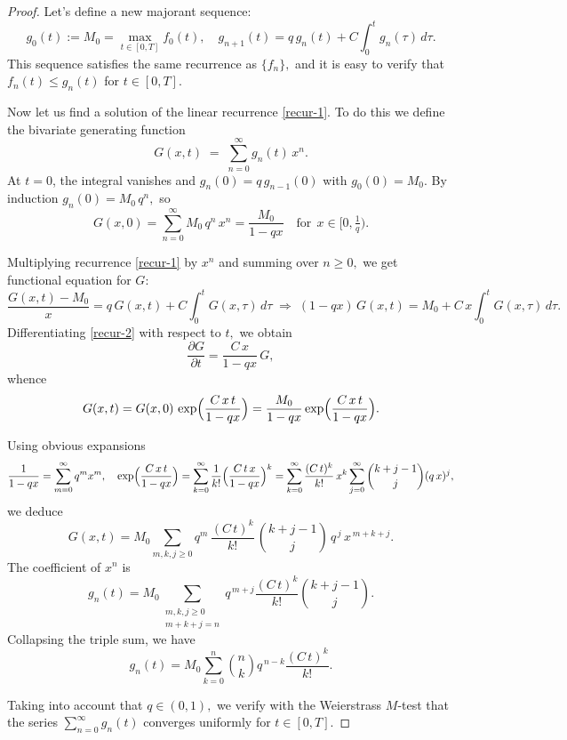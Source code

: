\documentclass[reqno]{amsart}            %
\numberwithin{equation}{section}
\begin{document}
	\begin{proof} 
		Let’s define a new majorant sequence:
		\begin{equation}\label{recur-1}
			g_0(t) := M_0 = \max_{t \in [0,T]} f_0(t), \quad
			g_{n+1}(t) = q\,  g_n(t) + C \int_0^t g_n(\tau)\, d\tau.
		\end{equation}
		This sequence satisfies the same recurrence as $\{f_n\},$ and it is easy to verify that
		$f_n(t) \le g_n(t)$ for $t\in [0,T].$
		
		Now let us find a solution of  the linear recurrence \eqref{recur-1}. To do this we define the bivariate generating function
		\[
		G(x,t)\;=\;\sum_{n=0}^{\infty}g_{n}(t)\,x^{n}.
		\]
		At \(t=0\), the integral vanishes and \(g_{n}(0)=q\,g_{n-1}(0)\) with \(g_{0}(0)=M_{0}\).  By induction
		$g_{n}(0)=M_{0}\,q^{n},$
		so
		\[
		G(x,0)
		=\sum_{n=0}^{\infty}M_{0}\,q^{n}\,x^{n}
		=\frac{M_{0}}{1-qx} \quad \text{for} \ \ x \in [0, \tfrac{1}{q}).
		\]
		
		Multiplying recurrence \eqref{recur-1} by $x^{n}$ and summing over $n\ge0,$ we get
		functional equation for $G$:
		\begin{equation}\label{recur-2}
			\frac{G(x,t)-M_{0}}{x}
			=q\,G(x,t)
			+ C\int_{0}^{t}G(x,\tau)\,d\tau
			\;\Longrightarrow\;
			(1-qx)\,G(x,t)
			= M_{0} + C\,x\int_{0}^{t}G(x,\tau)\,d\tau.
		\end{equation}
		Differentiating \eqref{recur-2} with respect to $t,$ we obtain 
		\[
		\frac{\partial G}{\partial t}
		= \frac{C\,x}{1-qx}\,G,
		\]
		whence 
		\[
		G(x,t)
		=G(x,0)\,
		\exp\Bigl(\frac{C\,x\,t}{1-qx}\Bigr)
		=\frac{M_{0}}{1-qx}
		\exp\Bigl(\frac{C\,x\,t}{1-qx}\Bigr).
		\]
		
		Using obvious expansions
		\[
		\frac{1}{1-qx}
		=\sum_{m=0}^{\infty}q^{m}x^{m},
		\quad
		\exp\Bigl(\frac{C\,x\,t}{1-qx}\Bigr)
		=\sum_{k=0}^{\infty}\frac{1}{k!}
		\Bigl(\frac{C\,t\,x}{1-qx}\Bigr)^{k}
		=\sum_{k=0}^{\infty}\frac{(C\,t)^{k}}{k!}\,x^{k}
		\sum_{j=0}^{\infty}\binom{k+j-1}{j}(q\,x)^{j},
		\]
		we deduce
		\[
		G(x,t)
		=M_{0}
		\sum_{m,k,j\ge0}
		q^{m}\,
		\frac{(C\,t)^{k}}{k!}\,
		\binom{k+j-1}{j}\,
		q^{\,j}\,
		x^{\,m+k+j}.
		\]
		The coefficient of $x^{n}$ is
		\[
		g_{n}(t)
		= M_{0}
		\sum_{\substack{m,k,j\ge0\\m+k+j=n}}
		q^{\,m+j}
		\frac{(C\,t)^{k}}{k!}
		\binom{k+j-1}{j}.
		\]
		Collapsing  the triple sum, we have
		\[
		g_{n}(t)
		= M_{0}
		\sum_{k=0}^{n}
		\binom{n}{k}
		q^{\,n-k}
		\frac{(C\,t)^{k}}{k!}.
		\]
		
		Taking into account that $q \in (0, 1),$ we verify with the  Weierstrass $M$-test that the series $\sum_{n=0}^{\infty} g_n(t) $
		converges uniformly for $t\in[0,T].$
	\end{proof}
	
\end{document}
